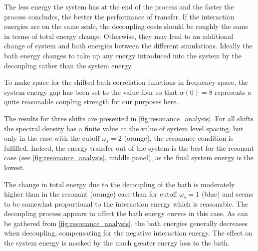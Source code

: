 The less energy the system has at the end of the process and the
faster the process concludes, the better the performance of
transfer. If the interaction energies are on the same scale, the
decoupling costs should be roughly the same in terms of total energy
change. Otherwise, they may lead to an additional change of system and
bath energies between the different simulations. Ideally the bath
energy changes to take up any energy introduced into the system by the
decoupling rather than the system energy.

To make space for the shifted bath correlation functions in frequency
space, the system energy gap has been set to the value four so that
\(α(0)=8\) represents a quite reasonable coupling strength for our
purposes here.

The results for three shifts are presented in
\cref{fig:resonance_analysis}. For all shifts the spectral density has
a finite value at the value of system level spacing, but only in the
case with the cutoff \(ω_s=2\) (orange), the resonance condition is
fulfilled. Indeed, the energy transfer out of the system is the best
for the resonant case (see \cref{fig:resonance_analysis}, middle
panel), as the final system energy is the lowest.

The change in total energy due to the decoupling of the bath is
moderately higher than in the resonant (orange) case than for cutoff
\(ω_s=1\) (blue) and seems to be somewhat proportional to the
interaction energy which is reasonable. The decoupling process appears
to affect the bath energy curves in this case. As can be gathered from
\cref{fig:resonance_analysis}, the bath energies generally decreases
when decoupling, compensating for the negative interaction energy. The
effect on the system energy is masked by the much greater energy loss
to the bath.

